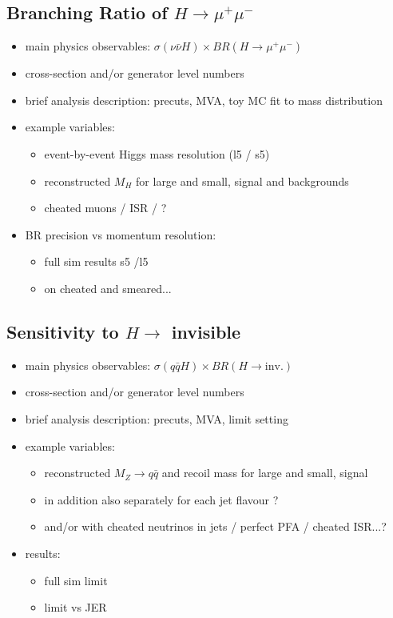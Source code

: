 \subsection{Branching Ratio of $H \to \mu^+\mu^-$}
\begin{itemize}
\item main physics observables: $\sigma(\nu\bar{\nu} H)\times BR(H\to \mu^+\mu^-)$
\item cross-section and/or generator level numbers  
\item brief analysis description: precuts, MVA, toy MC fit to mass distribution
\item example variables: 
  \begin{itemize}
     \item event-by-event Higgs mass resolution (l5 / s5)
     \item reconstructed $M_H$ for large and small, signal and backgrounds
   
     \item cheated muons / ISR / ?
  \end{itemize}
\item BR precision vs momentum resolution: 
  \begin{itemize}
     \item full sim results s5 /l5
     \item on cheated and smeared...
  \end{itemize}
\end{itemize}

\subsection{Sensitivity to $H \to $ invisible}
\begin{itemize}
\item main physics observables: $\sigma(q\bar{q} H)\times BR(H \to \mbox{inv.})$
\item cross-section and/or generator level numbers 
\item brief analysis description: precuts, MVA, limit setting
\item example variables:
  \begin{itemize}
     \item reconstructed $M_Z \to q\bar{q}$ and recoil mass for large and small, signal      \item in addition also separately for each jet flavour ?
     \item and/or with cheated neutrinos in jets / perfect PFA / cheated ISR...?
  \end{itemize}
\item results: 
  \begin{itemize}
     \item full sim limit
     \item limit vs JER
  \end{itemize}
\end{itemize}

